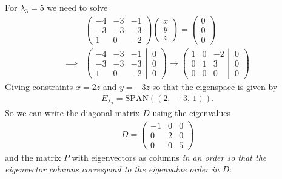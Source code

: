 {\noindent For $\lambda_3=5$ we need to solve
\begin{align*}
& \begin{pmatrix}
 -4 & -3 & -1 \\
 -3 & -3 & -3 \\
  1 &  0 & -2
\end{pmatrix}
\begin{pmatrix} x \\ y \\ z \end{pmatrix}
= 
\begin{pmatrix}
  0 \\
  0  \\
  0 
\end{pmatrix}
\\
\implies &
\left(
	\begin{matrix}
 -4 & -3 & -1 \\
 -3 & -3 & -3 \\
  1 &  0 & -2
	\end{matrix}
  \left| \, 
	\begin{matrix}
  0 \\
  0 \\
  0 
	\end{matrix}
  \right.
\right)
\to
\left(
	\begin{matrix}
  1 &  0 & -2 \\
  0 &  1 &  3 \\
  0 &  0 &  0
	\end{matrix}
  \left| \, 
	\begin{matrix}
	  0 \\
	  0 \\
	  0 
    \end{matrix}
  \right.
\right)
\end{align*}
Giving constraints $x=2z$ and $y=-3z$ so that the eigenspace is given by
\begin{align*}
E_{\lambda_2} = \text{SPAN}((2,\,-3,\,1)).
\end{align*}
So we can write the diagonal matrix $D$ using the eigenvalues
\begin{align*}
D = 
 \begin{pmatrix}
 -1 &  0 &  0 \\
  0 &  2 &  0 \\
  0 &  0 &  5
 \end{pmatrix}
\end{align*}
and the matrix $P$ with eigenvectors as columns \textit{in an order so that the eigenvector columns correspond to the eigenvalue order in $D$}:
}
